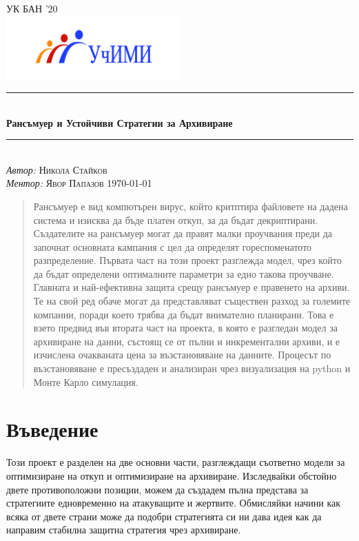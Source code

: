 \documentclass[11pt, a4paper]{article}
\theoremstyle{definition}
\begin{document}
\begin{titlepage}
	\newcommand{\HRule}{\rule{\linewidth}{0.5mm}}
	\centering
	\textsc{\LARGE УК БАН '20}\\
	\includegraphics[width=0.5\textwidth]{Uchimi_logo}\\
	\HRule\\[1 cm]
	{\huge\bfseries Рансъмуер и Устойчиви Стратегии за Архивиране}\\[1 cm]
	\HRule\\
	\vfill
			\Large
			\textit{Автор:}
			 \textsc{Никола Стайков}\\
             \vspace{2cm}
			\Large
			\textit{Ментор:}
            \textsc{Явор Папазов}
    \vfill	
	{\large\today}   
	\vfill
\end{titlepage}

\tableofcontents
\newpage
\begin{abstract}
		Рансъмуер е вид компютърен вирус, който критптира файловете на дадена система и изисква да бъде платен откуп, за да бъдат декриптирани. Създателите на рансъмуер могат да правят малки проучвания преди да започнат основната кампания с цел да определят гореспоменатото разпределение. Първата част на този проект разглежда модел, чрез който да бъдат определени оптималните параметри за едно такова проучване. Главната и най-ефективна защита срещу рансъмуер е правенето на архиви. Те на свой ред обаче могат да представляват съществен разход за големите компании, поради което трябва да бъдат внимателно планирани. Това е взето предвид във втората част на проекта, в която е разгледан модел за архивиране на данни, състоящ се от пълни и инкрементални архиви, и е изчислена очакваната цена за възстановяване на данните. Процесът по възстановяване е пресъздаден и анализиран чрез визуализация на python и Монте Карло симулация.
\end{abstract}

\section{Въведение}
		Този проект е разделен на две основни части, разглеждащи съответно модели за оптимизиране на откуп и оптимизиране на архивиране. Изследвайки обстойно двете противоположни позиции, можем да създадем пълна представа за стратегиите едновременно на атакуващите и жертвите. Обмисляйки начини как всяка от двете страни може да подобри стратегията си ни дава идея как да направим стабилна защитна стратегия чрез архивиране.
\end{document}
